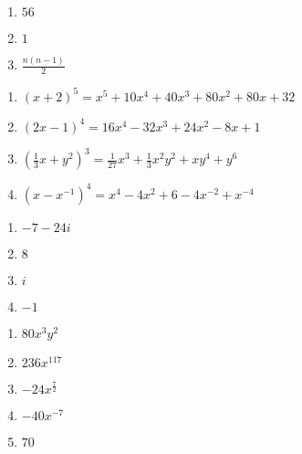 \begin{multicols}{3}
\begin{enumerate}
\setcounter{enumi}{\value{HW}}

\item  $56$

\item  $1$

\item  $\frac{n(n-1)}{2}$

\setcounter{HW}{\value{enumi}}
\end{enumerate}
\end{multicols}


\begin{enumerate}
\setcounter{enumi}{\value{HW}}

\item  $(x+2)^5 = x^5+10x^4+40x^3+80x^2+80x+32$

\item  $(2x-1)^4 = 16x^4-32x^3+24x^2-8x+1$

\item  $\left(\frac{1}{3} x +  y^2\right)^3 = \frac{1}{27} x^3+\frac{1}{3}x^2y^2+xy^4+y^6$

\item  $\left(x - x^{-1} \right)^{4} = x^4-4x^2+6-4x^{-2}+x^{-4}$

\setcounter{HW}{\value{enumi}}
\end{enumerate}


\begin{multicols}{4}
\begin{enumerate}
\setcounter{enumi}{\value{HW}}

\item  $-7-24i$

\item  $8$

\item $i$

\item  $-1$

\setcounter{HW}{\value{enumi}}
\end{enumerate}
\end{multicols}


\begin{multicols}{5}

\begin{enumerate}
\setcounter{enumi}{\value{HW}}

\item  $80x^3y^2$

\item  $236x^{117}$

\item  $-24x^{\frac{7}{2}}$

\item  $-40 x^{-7}$

\item  $70$

\end{enumerate}

\end{multicols}

\newpage
\closegraphsfile